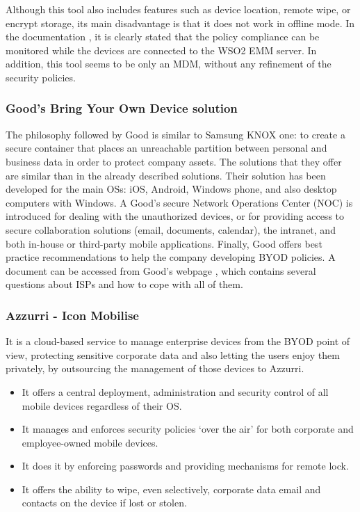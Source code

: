 Although this tool also includes features such as device location, remote wipe, or encrypt storage, its main disadvantage is that it does not work in offline mode. In the documentation \cite{wso2Pol}, it is clearly stated that the policy compliance can be monitored while the devices are connected to the WSO2 EMM server. In addition, this tool seems to be only an MDM, without any refinement of the security policies.

\subsubsection{Good's Bring Your Own Device solution}

The philosophy followed by Good \cite{Good_tool} is similar to Samsung KNOX one: to create a secure container that places an unreachable partition between personal and business data in order to protect company assets. The solutions that they offer \cite{Good_tool} are similar than in the already described solutions. Their solution has been developed for the main OSs: iOS, Android, Windows phone, and also desktop computers with Windows. A Good's secure Network Operations Center (NOC) is introduced for dealing with the unauthorized devices, or for providing access to secure collaboration solutions (email, documents, calendar), the intranet, and both in-house or third-party mobile applications. Finally, Good offers best practice recommendations to help the company developing BYOD policies. A document can be accessed from Good's webpage \cite{Good_tool}, which contains several questions about ISPs and how to cope with all of them.

\subsubsection{Azzurri - Icon Mobilise}

It is a cloud-based service \cite{Azzurri_tool} to manage enterprise devices from the BYOD point of view, protecting sensitive corporate data and also letting the users enjoy them privately, by outsourcing the management of those devices to Azzurri.
 
\begin{itemize}
\item It offers a central deployment, administration and security control of all mobile devices regardless of their OS.
\item It manages and enforces security policies `over the air' for both corporate and employee-owned mobile devices.
\item It does it by enforcing passwords and providing mechanisms for remote lock.
\item It offers the ability to wipe, even selectively, corporate data email and contacts on the device if lost or stolen.
\end{itemize}


